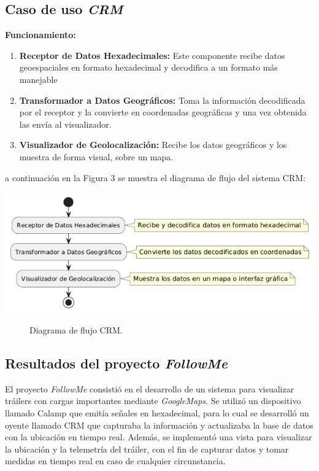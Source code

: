\documentclass[protocolo.tex]{subfiles}
\begin{document}
\subsection{Caso de uso \textit{CRM}} 
\textbf{Funcionamiento:}
\begin{enumerate}
    \item \textbf{Receptor de Datos Hexadecimales:}  
    Este componente recibe datos geoespaciales en formato hexadecimal y decodifica a un formato más manejable
    \item \textbf{Transformador a Datos Geográficos:}  
    Toma la información decodificada por el receptor y la convierte en coordenadas geográficas y una vez obtenida las envía al visualizador.
    \item \textbf{Visualizador de Geolocalización:}  
    Recibe los datos geográficos y los muestra de forma visual, sobre un mapa.
\end{enumerate}
a continuación en la Figura 3 se muestra el diagrama de flujo del sistema CRM:\vspace{4mm}
\begin{center}
\includegraphics[scale=0.6]{Imagenes/pdf/crmF.png}
\end{center}
\begin{figure}[h]  %
    \centering
    \caption{Diagrama de flujo CRM.}
    \label{fig:mi-figura3}
\end{figure}

\subsection{Resultados del proyecto \textit{FollowMe}}

El proyecto \textit{FollowMe} consistió en el desarrollo de un sistema para visualizar tráilers con cargas importantes mediante \textit{GoogleMaps}.  Se utilizó un dispositivo llamado Calamp que emitía señales en hexadecimal, para lo cual se desarrolló un oyente llamado CRM que capturaba la información y  actualizaba la base de datos con la ubicación en tiempo real.  Además, se implementó una vista para visualizar la ubicación y la telemetría del tráiler, con el fin de capturar datos y tomar medidas en tiempo real en caso de cualquier circunstancia.\vspace{4mm}
\end{document}

